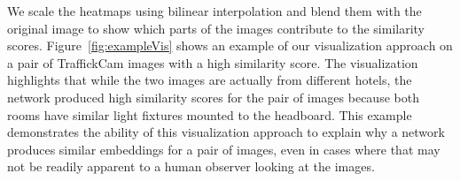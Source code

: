 \documentclass[12pt]{article}
\begin{document}
We scale the heatmaps using bilinear interpolation and blend them with the original image to show which parts of the images contribute to the similarity scores. Figure~\ref{fig:exampleVis} shows an example of our visualization approach on a pair of TraffickCam images with a high similarity score. The visualization highlights that while the two images are actually from different hotels, the network produced high similarity scores for the pair of images because both rooms have similar light fixtures mounted to the headboard. This example demonstrates the ability of this visualization approach to explain why a network produces similar embeddings for a pair of images, even in cases where that may not be readily apparent to a human observer looking at the images.



\end{document}
